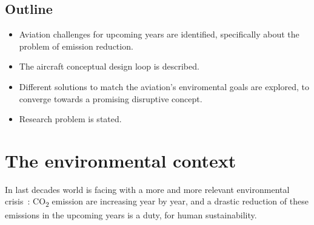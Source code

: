 \minitoc

\clearpage

\begin{mdframed}[hidealllines=true,backgroundcolor=purple!20]
	\section*{Outline}
	
	\begin{itemize}
		\item Aviation challenges for upcoming years are identified, specifically about the problem of emission reduction. 
		
		\item The aircraft conceptual design loop is described. 
		
		\item Different solutions to match the aviation's enviromental goals are explored, to converge towards a promising disruptive concept. 
		
		\item Research problem is stated. 
		
	\end{itemize}
\end{mdframed}

\cleardoublepage

\section{The environmental context}
\label{sec:chap1_context}
In last decades world is facing with a more and more relevant environmental crisis~\cite{bib:nasa_armd, bib:environmental_outlook_2050, bib:he_aviation_course}: CO\textsubscript{2} emission are increasing year by year, and a drastic reduction of these emissions in the upcoming years is a duty, for human sustainability. 

